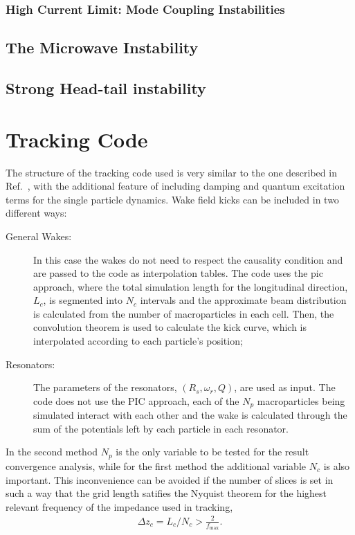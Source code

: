 \subsubsection{High Current Limit: Mode Coupling Instabilities}
\subsection{The Microwave Instability}
\subsection{Strong Head-tail instability}

\section{Tracking Code}\label{sec:tracking_code}

    The structure of the tracking code used is very similar to the one described in Ref.~, with the additional feature of including damping and quantum excitation terms for the single particle dynamics. Wake field kicks can be included in two different ways:
    \begin{description}
        \item[General Wakes:] In this case the wakes do not need to respect the causality condition and are passed to the code as interpolation tables. The code uses the \gls{pic} approach, where the total simulation length for the longitudinal direction, $L_c$, is segmented into $N_c$ intervals and the approximate beam distribution is calculated from the number of macroparticles in each cell. Then, the convolution theorem is used to calculate the kick curve\cite{Bassi2016}, which is interpolated according to each particle's position;
        \item[Resonators:] The parameters of the resonators, $(R_s, \omega_r, Q)$, are used as input. The code does not use the PIC approach, each of the $N_p$ macroparticles being simulated interact with each other and the wake is calculated through the sum of the potentials left by each particle in each resonator.
    \end{description}

    In the second method $N_p$ is the only variable to be tested for the result convergence analysis, while for the first method the additional variable $N_c$ is also important. This inconvenience can be avoided if the number of slices is set in such a way that the grid length satifies the Nyquist theorem for the highest relevant frequency of the impedance used in tracking,
    \begin{align} \label{eq:nyquist_theorem}
        \Delta z_c = L_c/N_c > \frac{2}{f_\text{max}}.
    \end{align}

